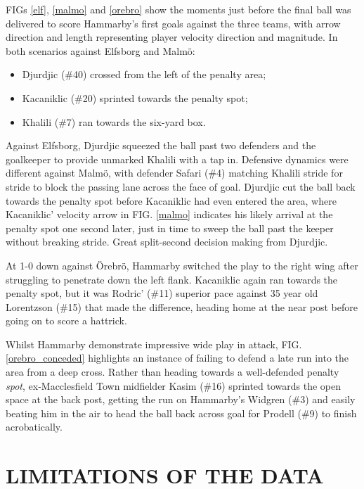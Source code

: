 \documentclass[twocolumn,prl,nobalancelastpage,aps,10pt]{revtex4-1}
\begin{document}
FIGs \ref{elf}, \ref{malmo} and \ref{orebro} show the moments just before the final ball was delivered to score Hammarby's first goals against the three teams, with arrow direction and length representing player velocity direction and magnitude. In both scenarios against Elfsborg and Malm{\"o}:
\begin{itemize}[noitemsep]
	\item Djurdjic (\#40) crossed from the left of the penalty area;
        \item Kacaniklic (\#20) sprinted towards the penalty spot;
        \item Khalili (\#7) ran towards the six-yard box.
\end{itemize}

Against Elfsborg, Djurdjic squeezed the ball past two defenders and the goalkeeper to provide unmarked Khalili with a tap in. Defensive dynamics were different against Malm{\"o}, with defender Safari (\#4) matching Khalili stride for stride to block the passing lane across the face of goal. Djurdjic cut the ball back towards the penalty spot before Kacaniklic had even entered the area, where Kacaniklic' velocity arrow in FIG. \ref{malmo} indicates his likely arrival at the penalty spot one second later, just in time to sweep the ball past the keeper without breaking stride. Great split-second decision making from Djurdjic.



At 1-0 down against {\"O}rebr{\"o}, Hammarby switched the play to the right wing after struggling to penetrate down the left flank. Kacaniklic again ran towards the penalty spot, but it was Rodric' (\#11) superior pace against 35 year old Lorentzson (\#15) that made the difference, heading home at the near post before going on to score a hattrick.

Whilst Hammarby demonstrate impressive wide play in attack, FIG. \ref{orebro_conceded} highlights an instance of failing to defend a late run into the area from a deep cross. Rather than heading towards a well-defended penalty \textit{spot}, ex-Macclesfield Town midfielder Kasim (\#16) sprinted towards the open space at the back post, getting the run on Hammarby's Widgren (\#3) and easily beating him in the air to head the ball back across goal for Prodell (\#9) to finish acrobatically.

\section{LIMITATIONS OF THE DATA}
\end{document}
